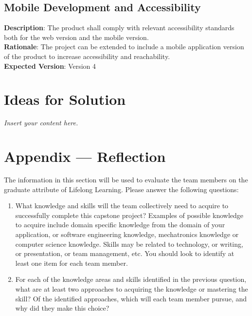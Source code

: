 \documentclass[12pt]{article}
\newcommand{\lips}{\textit{Insert your content here.}}
\begin{document}
\subsection{Mobile Development and Accessibility}
\textbf{Description}: The product shall comply with relevant accessibility standards both for the web version and the mobile version.\\
\textbf{Rationale}: The project can be extended to include a mobile application version of the product to increase accessibility and reachability.\\
\textbf{Expected Version}: Version 4

\section{Ideas for Solution}
\lips

\newpage{}
\section*{Appendix --- Reflection}

The information in this section will be used to evaluate the team members on the
graduate attribute of Lifelong Learning.  Please answer the following questions:

\begin{enumerate}
  \item What knowledge and skills will the team collectively need to acquire to
  successfully complete this capstone project?  Examples of possible knowledge
  to acquire include domain specific knowledge from the domain of your
  application, or software engineering knowledge, mechatronics knowledge or
  computer science knowledge.  Skills may be related to technology, or writing,
  or presentation, or team management, etc.  You should look to identify at
  least one item for each team member.
  \item For each of the knowledge areas and skills identified in the previous
  question, what are at least two approaches to acquiring the knowledge or
  mastering the skill?  Of the identified approaches, which will each team
  member pursue, and why did they make this choice?
\end{enumerate}
\end{document}
